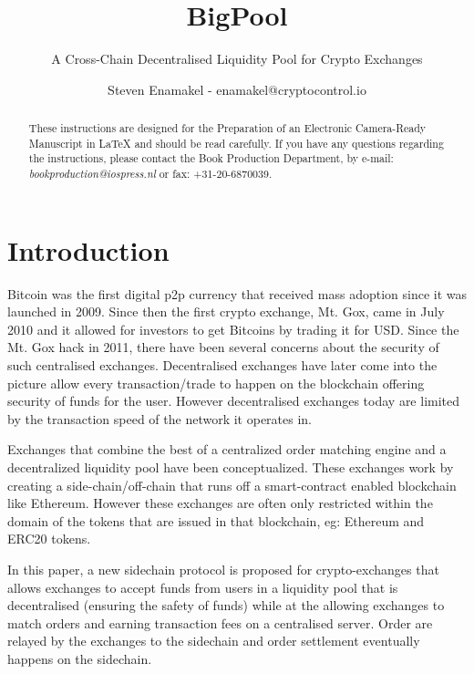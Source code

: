 \documentclass{Bigpool}
\begin{document}
\begin{frontmatter}              %

\title{BigPool}
\subtitle{A Cross-Chain Decentralised Liquidity Pool for Crypto Exchanges}
\author{Steven Enamakel - enamakel@cryptocontrol.io}

\begin{abstract}
These instructions are designed for the Preparation of an Electronic
Camera-Ready Manuscript in \LaTeX{} and should be read carefully. If you
have any questions regarding the instructions, please contact the Book
Production Department, by e-mail: \textit{bookproduction@iospress.nl}
or fax: +31-20-6870039.
\end{abstract}

\end{frontmatter}


\section*{Introduction}
Bitcoin was the first digital p2p currency that received mass adoption since it was launched in 2009. Since then the first crypto exchange, Mt. Gox, came in July 2010 and it allowed for investors to get Bitcoins by trading it for USD. Since the Mt. Gox hack in 2011, there have been several concerns about the security of such centralised exchanges. Decentralised exchanges have later come into the picture allow every transaction/trade to happen on the blockchain offering security of funds for the user. However decentralised exchanges today are limited by the transaction speed of the network it operates in.

Exchanges that combine the best of a centralized order matching engine and a decentralized liquidity pool have been conceptualized. These exchanges work by creating a side-chain/off-chain that runs off a smart-contract enabled blockchain like Ethereum. However these exchanges are often only restricted within the domain of the tokens that are issued in that blockchain, eg: Ethereum and ERC20 tokens. 

In this paper, a new sidechain protocol is proposed for crypto-exchanges that allows exchanges to accept funds from users in a liquidity pool that is decentralised (ensuring the safety of funds) while at the allowing exchanges to match orders and earning transaction fees on a centralised server. Order are relayed by the exchanges to the sidechain and order settlement eventually happens on the sidechain. 
\end{document}
